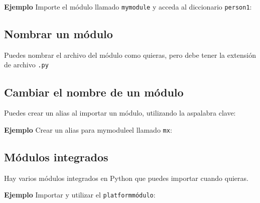 \textbf{Ejemplo} Importe el módulo llamado \texttt{mymodule} y acceda al
diccionario \texttt{person1}:

\begin{Shaded}
\begin{Highlighting}[]

\OperatorTok{=}\NormalTok{ mymodule.person1[}\NormalTok{]}
\end{Highlighting}
\end{Shaded}

\subsection{Nombrar un módulo}\label{nombrar-un-muxf3dulo}

Puedes nombrar el archivo del módulo como quieras, pero debe tener la
extensión de archivo \texttt{.py}

\subsection{Cambiar el nombre de un
módulo}\label{cambiar-el-nombre-de-un-muxf3dulo}

Puedes crear un alias al importar un módulo, utilizando la aspalabra
clave:

\textbf{Ejemplo} Crear un alias para mymoduleel llamado \texttt{mx}:

\begin{Shaded}
\begin{Highlighting}[]

\OperatorTok{=}\NormalTok{ mx.person1[}\NormalTok{]}
\end{Highlighting}
\end{Shaded}

\subsection{Módulos integrados}\label{muxf3dulos-integrados}

Hay varios módulos integrados en Python que puedes importar cuando
quieras.

\textbf{Ejemplo} Importar y utilizar el \texttt{platformmódulo}:

\begin{Shaded}
\begin{Highlighting}[]

\OperatorTok{=}
\end{Highlighting}
\end{Shaded}

